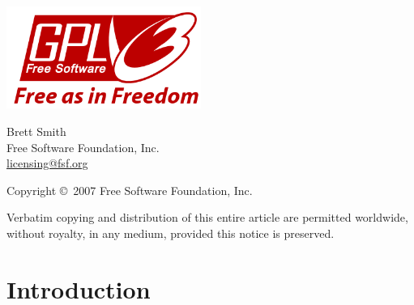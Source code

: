 \maketitle

\thispagestyle{empty}

\vspace{72pt}

\begin{center}
\includegraphics[width=2.5in]{web-logo-full-red.png}
\end{center}

\vspace{72pt}

\begin{center}
\large{Brett Smith} \\
\large{Free Software Foundation, Inc.} \\
\large{\href{mailto:licensing@fsf.org}{licensing@fsf.org}} \\
\end{center}

\vspace{72pt}

\begin{center}
Copyright \copyright\ 2007 Free Software Foundation, Inc. \\
\end{center}

\noindent
Verbatim copying and distribution of this entire article are permitted
worldwide, without royalty, in any medium, provided this notice is
preserved.


\newpage

\setlength{\locallinewidth}{\linewidth}

\hypertarget{introduction}{}
\section*{Introduction}

